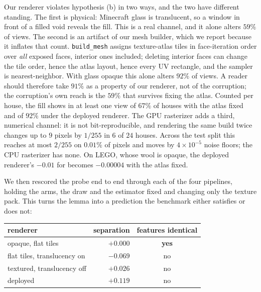 Our renderer violates hypothesis (b) in two ways, and the two have different
standing. The first is physical: Minecraft glass is translucent, so a
window in front of a filled void reveals the fill. This is a real channel, and
it alone alters $59\%$ of views. The second is an artifact of our mesh builder,
which we report because it inflates that count. \texttt{build\_mesh} assigns
texture-atlas tiles in face-iteration order over \emph{all} exposed faces,
interior ones included; deleting interior faces can change the tile order, hence
the atlas layout, hence every UV rectangle, and the sampler is nearest-neighbor.
With glass opaque this alone alters $92\%$ of views. A reader should
therefore take $91\%$ as a property of our renderer, not of the corruption; the
corruption's own reach is the $59\%$ that survives fixing the atlas. Counted per
house, the fill shows in at least one view of $67\%$ of houses with the atlas
fixed and of $92\%$ under the deployed renderer. The GPU
rasterizer adds a third, numerical channel: it is not bit-reproducible, and
rendering the same build twice changes up to $9$ pixels by $1/255$ in $6$ of $24$
houses. Across the test split this reaches at most $2/255$ on $0.01\%$ of pixels
and moves \mvkid{} by $4\times10^{-5}$ noise floors; the CPU rasterizer has none.
On LEGO, whose wool is opaque, the deployed renderer's $-0.01$ for \solidify{}
becomes $-0.00004$ with the atlas fixed.

We then rescored the probe end to end through each of the four pipelines, holding
the arms, the draw and the estimator fixed and changing only the texture pack.
This turns the lemma into a prediction the benchmark either satisfies or does
not:

\begin{center}\small
\begin{tabular}{lrc}
\toprule
renderer & \mvkid{} separation & features identical \\
\midrule
opaque, flat tiles & $\mathbf{+0.000}$ & \textbf{yes} \\
flat tiles, translucency on & $-0.069$ & no \\
textured, translucency off & $+0.026$ & no \\
deployed & $+0.119$ & no \\
\bottomrule
\end{tabular}
\end{center}

